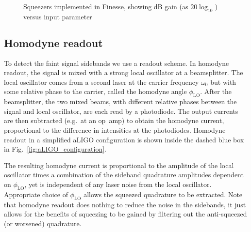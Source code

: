 \documentclass[aps,pra,superscriptaddress,reprint,nofootinbib]{revtex4-1}
\begin{document}
\begin{figure}%
    \centering
    \qquad
    \caption{Squeezers implemented in Finesse, showing dB gain (as $20 \log_{10}$) versus input parameter}%
    \label{fig:testing_Finesse_squeezers}%
\end{figure}

\subsection{Homodyne readout}

To detect the faint signal sidebands we use a readout scheme. In homodyne readout, the signal is mixed with a strong local oscillator at a beamsplitter. The local oscillator comes from a second laser at the carrier frequency $\omega_0$ but with some relative phase to the carrier, called the homodyne angle $\phi_{\mathrm{LO}}$. After the beamsplitter, the two mixed beams, with different relative phases between the signal and local oscillator, are each read by a photodiode. The output currents are then subtracted (e.g.\ at an op~amp) to obtain the homodyne current, proportional to the difference in intensities at the photodiodes. Homodyne readout in a simplified aLIGO configuration is shown inside the dashed blue box in Fig.~\ref{fig:aLIGO_configuration}.


The resulting homodyne current is proportional to the amplitude of the local oscillator times a combination of the sideband quadrature amplitudes dependent on $\phi_{\mathrm{LO}}$, yet is independent of any laser noise from the local oscillator. Appropriate choice of $\phi_{\mathrm{LO}}$ allows the squeezed quadrature to be extracted. Note that homodyne readout does nothing to reduce the noise in the sidebands, it just allows for the benefits of squeezing to be gained by filtering out the anti-squeezed (or worsened) quadrature.
\end{document}
